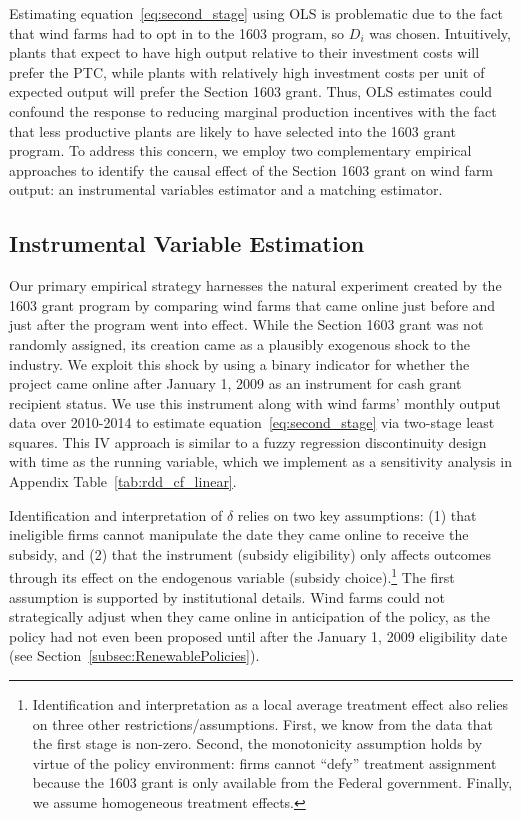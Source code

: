 \documentclass[12pt]{article}
\begin{document}
Estimating equation~\ref{eq:second_stage} using OLS is problematic due to the fact that wind farms had to opt in to the 1603 program, so $D_{i}$ was chosen. Intuitively, plants that expect to have high output relative to their investment costs will prefer the PTC, while plants with relatively high investment costs per unit of expected output will prefer the Section 1603 grant. Thus, OLS estimates could confound the response to reducing marginal production incentives with the fact that less productive plants are likely to have selected into the 1603 grant program. To address this concern, we employ two complementary empirical approaches to identify the causal effect of the Section 1603 grant on wind farm output: an instrumental variables estimator and a matching estimator.

\subsection{Instrumental Variable Estimation}

Our primary empirical strategy harnesses the natural experiment created by the 1603 grant program by comparing wind farms that came online just before and just after the program went into effect. While the Section 1603 grant was not randomly assigned, its creation came as a plausibly exogenous shock to the industry. We exploit this shock by using a binary indicator for whether the project came online after January 1, 2009 as an instrument for cash grant recipient status. We use this instrument along with wind farms' monthly output data over 2010-2014 to estimate equation~\ref{eq:second_stage} via two-stage least squares. This IV approach is similar to a fuzzy regression discontinuity design with time as the running variable, which we implement as a sensitivity analysis in Appendix Table~\ref{tab:rdd_cf_linear}.

Identification and interpretation of $\delta$ relies on two key assumptions: (1) that ineligible firms cannot manipulate the date they came online to receive the subsidy, and (2) that the instrument (subsidy eligibility) only affects outcomes through its effect on the endogenous variable (subsidy choice).\footnote{Identification and interpretation as a local average treatment effect also relies on three other restrictions/assumptions. First, we know from the data that the first stage is non-zero. Second, the monotonicity assumption holds by virtue of the policy environment: firms cannot ``defy'' treatment assignment because the 1603 grant is only available from the Federal government. Finally, we assume homogeneous treatment effects.} The first assumption is supported by institutional details. Wind farms could not strategically adjust when they came online in anticipation of the policy, as the policy had not even been proposed until after the January 1, 2009 eligibility date (see Section~\ref{subsec:RenewablePolicies}). 
\end{document}
